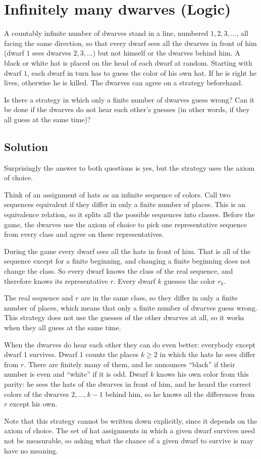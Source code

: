 \section {Infinitely many dwarves (Logic)}

A countably infinite number of dwarves stand in a line, numbered $1, 2, 3, \ldots$, all facing the same direction,
so that every dwarf sees all the dwarves in front of him (dwarf $1$ sees dwarves $2, 3, \ldots$) but not himself or the dwarves behind him.
A black or white hat is placed on the head of each dwarf at random.
Starting with dwarf $1$, each dwarf in turn has to guess the color of his own hat. If he is right he lives, otherwise he is killed.
The dwarves can agree on a strategy beforehand.

Is there a strategy in which only a finite number of dwarves guess wrong?
Can it be done if the dwarves do not hear each other's guesses (in other words, if they all guess at the same time)?

\subsection{Solution}

Surprisingly the answer to both questions is yes, but the strategy uses the axiom of choice.

Think of an assignment of hats as an infinite sequence of colors.
Call two sequences equivalent if they differ in only a finite number of places.
This is an equivalence relation, so it splits all the possible sequences into classes.
Before the game, the dwarves use the axiom of choice to pick one representative sequence from every class and agree on these representatives.

During the game every dwarf sees all the hats in front of him. That is all of the sequence except for a finite beginning,
and changing a finite beginning does not change the class. So every dwarf knows the class of the real sequence,
and therefore knows its representative $r$. Every dwarf $k$ guesses the color $r_k$.

The real sequence and $r$ are in the same class, so they differ in only a finite number of places,
which means that only a finite number of dwarves guess wrong.
This strategy does not use the guesses of the other dwarves at all, so it works when they all guess at the same time.

When the dwarves do hear each other they can do even better: everybody except dwarf $1$ survives.
Dwarf $1$ counts the places $k \ge 2$ in which the hats he sees differ from $r$. There are finitely many of them,
and he announces ``black'' if their number is even and ``white'' if it is odd.
Dwarf $k$ knows his own color from this parity: he sees the hats of the dwarves in front of him,
and he heard the correct colors of the dwarves $2, \ldots, k-1$ behind him, so he knows all the differences from $r$ except his own.

Note that this strategy cannot be written down explicitly, since it depends on the axiom of choice.
The set of hat assignments in which a given dwarf survives need not be measurable, so asking what the chance of a given dwarf to survive is may have no meaning.
